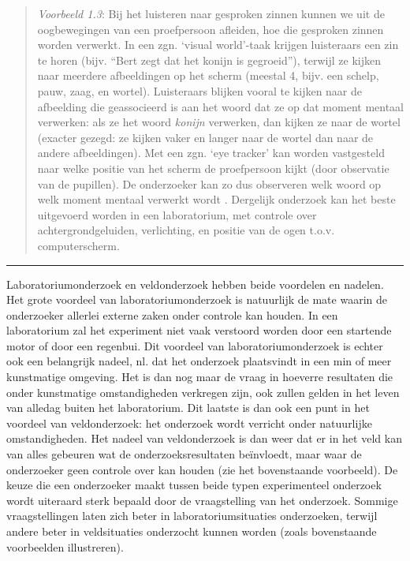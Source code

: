 \documentclass[
]{book}
\begin{document}
\begin{quote}
\emph{Voorbeeld 1.3}: Bij het luisteren naar gesproken zinnen kunnen we uit de oogbewegingen van een proefpersoon afleiden, hoe die gesproken zinnen worden verwerkt. In een zgn. `visual world'-taak krijgen luisteraars een zin te horen (bijv. ``Bert zegt dat het konijn is gegroeid''), terwijl ze kijken naar meerdere afbeeldingen op het scherm (meestal 4, bijv. een schelp, pauw, zaag, en wortel). Luisteraars blijken vooral te kijken naar de afbeelding die geassocieerd is aan het woord dat ze op dat moment mentaal verwerken: als ze het woord \emph{konijn} verwerken, dan kijken ze naar de wortel (exacter gezegd: ze kijken vaker en langer naar de wortel dan naar de andere afbeeldingen). Met een zgn. `eye tracker' kan worden vastgesteld naar welke positie van het scherm de proefpersoon kijkt (door observatie van de pupillen). De onderzoeker kan zo dus observeren welk woord op welk moment mentaal verwerkt wordt \citep{KMR12}. Dergelijk onderzoek kan het beste uitgevoerd worden in een laboratorium, met controle over achtergrondgeluiden, verlichting, en positie van de ogen t.o.v. computerscherm.
\end{quote}

\begin{center}\rule{0.5\linewidth}{0.5pt}\end{center}

Laboratoriumonderzoek en veldonderzoek hebben beide voordelen en
nadelen. Het grote voordeel van laboratoriumonderzoek is natuurlijk de
mate waarin de onderzoeker allerlei externe zaken onder controle kan
houden. In een laboratorium zal het experiment niet vaak verstoord
worden door een startende motor of door een regenbui. Dit voordeel van
laboratoriumonderzoek is echter ook een belangrijk nadeel, nl. dat het
onderzoek plaatsvindt in een min of meer kunstmatige omgeving. Het is
dan nog maar de vraag in hoeverre resultaten die onder kunstmatige
omstandigheden verkregen zijn, ook zullen gelden in het leven van
alledag buiten het laboratorium. Dit laatste is dan ook een punt in het
voordeel van veldonderzoek: het onderzoek wordt verricht onder
natuurlijke omstandigheden. Het nadeel van veldonderzoek is dan weer dat
er in het veld kan van alles gebeuren wat de onderzoeksresultaten
beïnvloedt, maar waar de onderzoeker geen controle over kan houden (zie het bovenstaande
voorbeeld). De keuze die een onderzoeker maakt tussen
beide typen experimenteel onderzoek wordt uiteraard sterk bepaald door
de vraagstelling van het onderzoek. Sommige vraagstellingen laten zich
beter in laboratoriumsituaties onderzoeken, terwijl andere beter in
veldsituaties onderzocht kunnen worden (zoals bovenstaande voorbeelden
illustreren).
\end{document}
